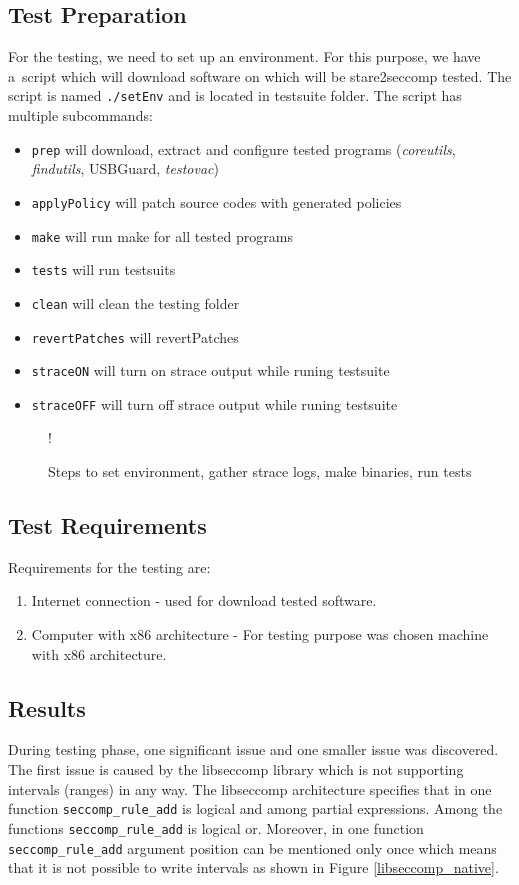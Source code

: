 \subsection{Test Preparation}
For the testing, we need to set up an environment. For this purpose, we have
a~script which will download software on which will be stare2seccomp tested. The
script is named \texttt{./setEnv} and is located in testsuite folder.
The script has multiple subcommands:
\begin{itemize}
	\item \texttt{prep} will download, extract and configure tested programs
		(\emph{coreutils}, \emph{findutils}, USBGuard, \emph{testovac})
	\item \texttt{applyPolicy} will patch source codes with generated policies
	\item \texttt{make} will run make for all tested programs
	\item \texttt{tests} will run testsuits
	\item \texttt{clean} will clean the testing folder
	\item \texttt{revertPatches} will revertPatches
	\item \texttt{straceON} will turn on strace output while runing testsuite
	\item \texttt{straceOFF} will turn off strace output while runing testsuite
\end{itemize}

\begin{figure}[H]
  \centering
   {!} {
    
  }
  \caption{Steps to set environment, gather strace logs, make binaries, run tests}
  \label{fig:tikz:setenv_architecture}
\end{figure}

\subsection{Test Requirements}
Requirements for the testing are:
\begin{enumerate}
	\item Internet connection - used for download tested software.
	\item Computer with x86 architecture - For testing purpose was chosen
	machine with x86 architecture.
\end{enumerate}

\subsection{Results} During testing phase, one significant issue and one smaller issue was
discovered. The first issue is caused by the libseccomp library which is not
supporting intervals (ranges) in any way. The libseccomp architecture specifies
that in one function \texttt{seccomp\_rule\_add} is logical and among partial
expressions. Among the functions \texttt{seccomp\_rule\_add} is logical or.
Moreover, in one function \texttt{seccomp\_rule\_add} argument position can be
mentioned only once which means that it is not possible to write intervals as
shown in Figure \ref{libseccomp_native}.

